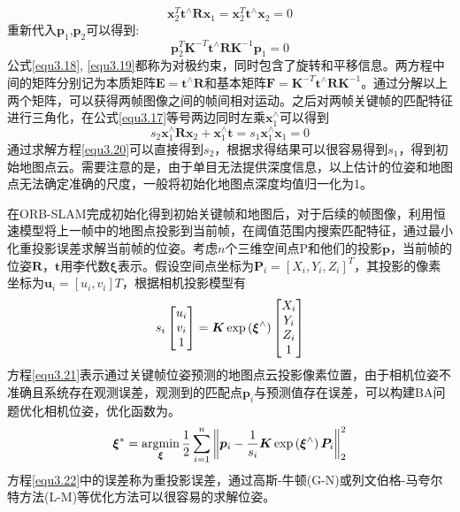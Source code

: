 \begin{equation}
\label{equ3.18}
\boldsymbol{x}_2^T  \boldsymbol{t}^{\wedge}  \boldsymbol{R} \boldsymbol{x}_1 = \boldsymbol{x}_2^T \boldsymbol{t}^{\wedge} \boldsymbol{x}_2 = 0
\end{equation}
重新代入$\boldsymbol{p}_1$,$\boldsymbol{p}_2$可以得到:
\begin{equation}
\label{equ3.19}
\boldsymbol{p}_2^T \boldsymbol{K}^{-T} \boldsymbol{t}^{\wedge}  \boldsymbol{R} \boldsymbol{K}^{-1} \boldsymbol{p}_1  = 0
\end{equation}
公式\eqref{equ3.18}, \eqref{equ3.19}都称为对极约束，同时包含了旋转和平移信息。两方程中间的矩阵分别记为本质矩阵$\boldsymbol{E} = \boldsymbol{t}^{\wedge}  \boldsymbol{R} $和基本矩阵$\boldsymbol{F} = \boldsymbol{K}^{-T} \boldsymbol{t}^{\wedge}  \boldsymbol{R} \boldsymbol{K}^{-1}$。通过分解以上两个矩阵，可以获得两帧图像之间的帧间相对运动。之后对两帧关键帧的匹配特征进行三角化，在公式\eqref{equ3.17}等号两边同时左乘$\boldsymbol{x}_1^{\wedge}$可以得到
\begin{equation}
\label{equ3.20}
s_2 \boldsymbol{x}_1^{\wedge} \boldsymbol{R} \boldsymbol{x}_2 + \boldsymbol{x}_1^{\wedge} \boldsymbol{t} = s_1 \boldsymbol{x}_1^{\wedge} \boldsymbol{x}_1 = 0
\end{equation}
通过求解方程\eqref{equ3.20}可以直接得到$s_2$，根据求得结果可以很容易得到$s_1$，得到初始地图点云。需要注意的是，由于单目无法提供深度信息，以上估计的位姿和地图点无法确定准确的尺度，一般将初始化地图点深度均值归一化为1。

在ORB-SLAM完成初始化得到初始关键帧和地图后，对于后续的帧图像，利用恒速模型将上一帧中的地图点投影到当前帧，在阈值范围内搜索匹配特征，通过最小化重投影误差求解当前帧的位姿。考虑$n$个三维空间点P和他们的投影$\boldsymbol{p}$，当前帧的位姿$\boldsymbol{R}$，$\boldsymbol{t}$用李代数$\boldsymbol{\xi}$表示。假设空间点坐标为$\boldsymbol{P}_i=[X_i,Y_i,Z_i]^T$，其投影的像素坐标为$\boldsymbol{u}_i = [u_i,v_i]T$，根据相机投影模型有
\begin{equation}
\label{equ3.21}
s_i
\begin{bmatrix}
u_i \cr v_i \cr 1\cr 
\end{bmatrix}
=
\boldsymbol{K} \exp\left( \boldsymbol{\xi}^{\wedge} \right)
\begin{bmatrix}
X_i \cr Y_i \cr Z_i \cr 1 \cr
\end{bmatrix}
\end{equation}
方程\eqref{equ3.21}表示通过关键帧位姿预测的地图点云投影像素位置，由于相机位姿不准确且系统存在观测误差，观测到的匹配点$\boldsymbol{p}_i$与预测值存在误差，可以构建BA问题优化相机位姿，优化函数为。
\begin{equation}
\label{equ3.22}
\boldsymbol{\xi}^* = \operatorname*{argmin}\limits_{\boldsymbol{\xi}} {1 \over 2} \sum\limits_{i=1}^n  \left \Vert \boldsymbol{p}_i - {1 \over s_i} \boldsymbol{K} \exp\left( \boldsymbol{\xi}^{\wedge} \right) \boldsymbol{P}_i  \right \Vert_2^2
\end{equation}
方程\eqref{equ3.22}中的误差称为重投影误差，通过高斯-牛顿(G-N)或列文伯格-马夸尔特方法(L-M)等优化方法可以很容易的求解位姿。

